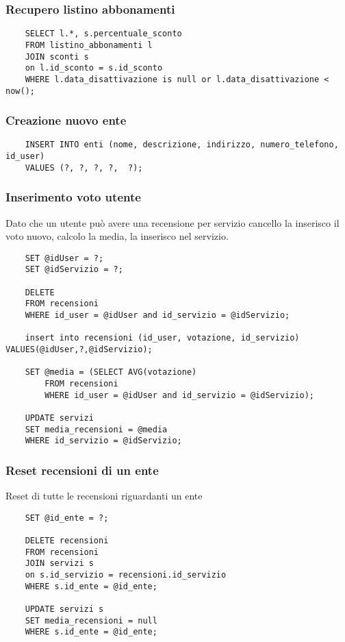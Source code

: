 \subsubsection{Recupero listino abbonamenti}
\begin{lstlisting}
    SELECT l.*, s.percentuale_sconto
    FROM listino_abbonamenti l
    JOIN sconti s
    on l.id_sconto = s.id_sconto
    WHERE l.data_disattivazione is null or l.data_disattivazione < now();
\end{lstlisting}


\subsubsection{Creazione nuovo ente}
\begin{lstlisting}
    INSERT INTO enti (nome, descrizione, indirizzo, numero_telefono, id_user) 
    VALUES (?, ?, ?, ?,  ?);
\end{lstlisting}









\subsubsection{Inserimento voto utente}
Dato che un utente può avere una recensione per servizio cancello la inserisco il voto nuovo, calcolo la media, la inserisco nel servizio.
\begin{lstlisting}
    SET @idUser = ?;
    SET @idServizio = ?;
    
    DELETE 
    FROM recensioni 
    WHERE id_user = @idUser and id_servizio = @idServizio;
    
    insert into recensioni (id_user, votazione, id_servizio) VALUES(@idUser,?,@idServizio);
    
    SET @media = (SELECT AVG(votazione) 
        FROM recensioni 
        WHERE id_user = @idUser and id_servizio = @idServizio);
    
    UPDATE servizi
    SET media_recensioni = @media
    WHERE id_servizio = @idServizio;
\end{lstlisting}



\subsubsection{Reset recensioni di un ente}
Reset di tutte le recensioni riguardanti un ente
\begin{lstlisting}
    SET @id_ente = ?;

    DELETE recensioni 
    FROM recensioni
    JOIN servizi s
    on s.id_servizio = recensioni.id_servizio
    WHERE s.id_ente = @id_ente;

    UPDATE servizi s
    SET media_recensioni = null
    WHERE s.id_ente = @id_ente;
\end{lstlisting}




